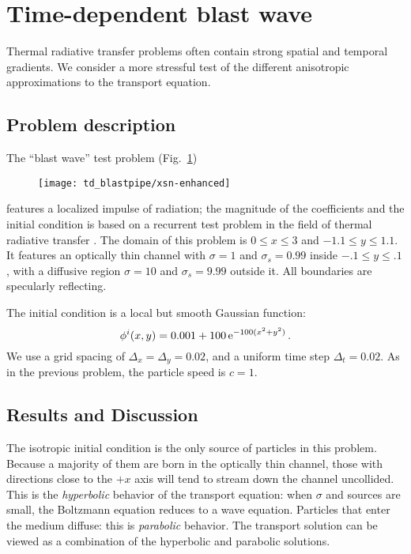 \clearpage

\section{Time-dependent blast wave}\label{sec:tdBlastwave}

Thermal radiative transfer problems often contain strong spatial and temporal
gradients. We consider a more stressful test of the different anisotropic
approximations to the transport equation.

\subsection{Problem description}

The ``blast wave'' test problem (Fig.~\ref{fig:tdBlastwaveXsn})
%
\begin{figure}[tb]
  \centering
  \hspace{-.5in}
  \texttt{[image: td\_blastpipe/xsn-enhanced]}
  \label{fig:tdBlastwaveXsn}
\end{figure}
%
features a localized impulse of radiation; the
magnitude of the coefficients and the initial condition is based on a recurrent
test problem in the field
of thermal radiative transfer \cite{Kno1999a,Kno2001,Rau2005,Ols2007}. The
domain of this problem is $0 \le x \le 3$ and $-1.1 \le y \le 1.1$.
It features an optically thin channel with $\sigma=1$ and $\sigma_s=0.99$ inside
$-.1 \le y \le .1$, with a diffusive region $\sigma=10$ and $\sigma_s=9.99$
outside it. All boundaries are specularly reflecting.

The initial condition is a local but smooth Gaussian function:
\begin{equation*}
  \phi^i(x,y) = 0.001 + 100 \mathop{}\!\mathrm{e}^{-100 (x^2 + y^2) }\,.
\end{equation*}
We use a grid spacing of $\Delta_x=\Delta_y=0.02$, and a uniform time step
$\Delta_t=0.02$. As in the previous problem, the particle speed is $c=1$.

\subsection{Results and Discussion}

The isotropic initial condition is the only source of particles in this
problem. Because a majority of them are born in the optically thin channel,
those with directions close to the $+x$ axis will tend to stream down the
channel uncollided. This is the \emph{hyperbolic} behavior of the transport
equation: when $\sigma$ and sources are small, the Boltzmann equation reduces
to a wave equation.
Particles that enter the medium diffuse: this is \emph{parabolic} behavior. The
transport solution can be viewed as a combination of the hyperbolic and
parabolic solutions.

